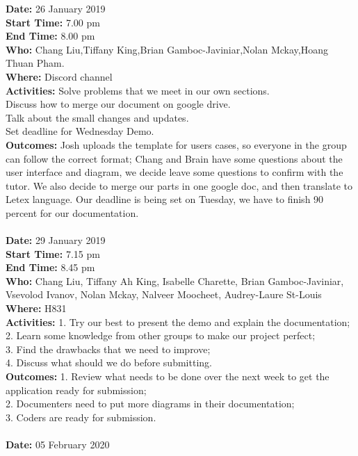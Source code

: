 \documentclass[12pt]{article}
\begin{document}
{\bf Date:} 26 January 2019\\
{\bf Start Time:} 7.00 pm\\
{\bf End Time:} 8.00 pm \\
{\bf Who:} Chang Liu,Tiffany King,Brian Gamboc-Javiniar,Nolan Mckay,Hoang Thuan Pham.\\
{\bf Where:} Discord channel \\
{\bf Activities:} Solve problems that we meet in our own sections. \\
Discuss how to merge our document on google drive.\\
Talk about the small changes and updates.\\
Set deadline for Wednesday Demo.\\
{\bf Outcomes:} Josh uploads the template for users cases, so everyone in the group can follow the correct format;
Chang and Brain have some questions about the user interface and diagram, we decide leave some questions to confirm with the tutor. We also decide to merge our parts in one google doc, and then translate to Letex language. Our deadline is being set on Tuesday, we have to finish 90 percent for our documentation.\\
\\
{\bf Date:} 29 January 2019\\
{\bf Start Time:} 7.15 pm\\
{\bf End Time:} 8.45 pm \\
{\bf Who:} Chang Liu, Tiffany Ah King, Isabelle Charette, Brian Gamboc-Javiniar, Vsevolod Ivanov, Nolan Mckay, Nalveer Moocheet, Audrey-Laure St-Louis\\
{\bf Where:} H831 \\
{\bf Activities:} 
1. Try our best to present the demo and explain the documentation;\\
2. Learn some knowledge from other groups to make our project perfect;\\
3. Find the drawbacks that we need to improve; \\
4. Discuss what should we do before submitting. \\
{\bf Outcomes:} 
1. Review what needs to be done over the next week to get the application ready for submission; \\
2. Documenters need to put more diagrams in their documentation;\\
3. Coders are ready for submission.\\
\\
{\bf Date:} 05 February 2020\\
\end{document}
